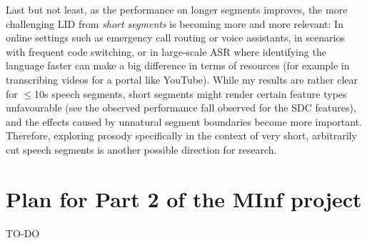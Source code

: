 \documentclass[bsc,frontabs,twoside,singlespacing,parskip,deptreport]{infthesis}
\begin{document}
{{    Last but not least, as the performance on longer segments improves, the more challenging LID from \textit{short segments} is becoming more and more relevant: In online settings such as emergency call routing or voice assistants, in scenarios with frequent code switching, or in large-scale ASR where identifying the language faster can make a big difference in terms of resources (for example in transcribing videos for a portal like YouTube).
    While my results are rather clear for $\leq$10s speech segments, short segments might render certain feature types unfavourable (see the observed performance fall observed for the SDC features), and the effects caused by unnatural segment boundaries become more important.
    Therefore, exploring prosody specifically in the context of very short, arbitrarily cut speech segments is another possible direction for research.
  }

  \section{Plan for Part 2 of the MInf project}{
    \label{sec:future-plan}
    TO-DO
  }
}




\appendix
\end{document}
